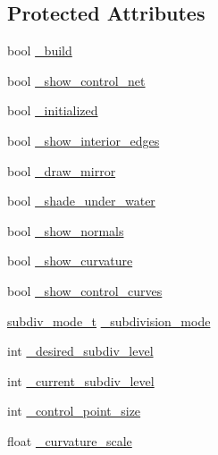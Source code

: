 \subsection*{Protected Attributes}
\begin{DoxyCompactItemize}
\item 
bool \hyperlink{classShipCAD_1_1SubdivisionSurface_ad360f009ac9c27aad0a88b2df7070414}{\-\_\-build}
\item 
bool \hyperlink{classShipCAD_1_1SubdivisionSurface_ab9bb374cf1368b4a2c779f953bca88a8}{\-\_\-show\-\_\-control\-\_\-net}
\item 
bool \hyperlink{classShipCAD_1_1SubdivisionSurface_a828f85ee49e1481e95f61b919070842c}{\-\_\-initialized}
\item 
bool \hyperlink{classShipCAD_1_1SubdivisionSurface_a4458d02152bd97495938586c89e6d9e2}{\-\_\-show\-\_\-interior\-\_\-edges}
\item 
bool \hyperlink{classShipCAD_1_1SubdivisionSurface_a4ee73ae98bddfe1819419afd1d5ba029}{\-\_\-draw\-\_\-mirror}
\item 
bool \hyperlink{classShipCAD_1_1SubdivisionSurface_ac3294d41679de31e588d603e3428565e}{\-\_\-shade\-\_\-under\-\_\-water}
\item 
bool \hyperlink{classShipCAD_1_1SubdivisionSurface_a0cc840743e7afcd136ab864ace158a17}{\-\_\-show\-\_\-normals}
\item 
bool \hyperlink{classShipCAD_1_1SubdivisionSurface_abe2167085eac50c986b074635b610462}{\-\_\-show\-\_\-curvature}
\item 
bool \hyperlink{classShipCAD_1_1SubdivisionSurface_ae240b2177e0af0bd1512c94b524f22dd}{\-\_\-show\-\_\-control\-\_\-curves}
\item 
\hyperlink{namespaceShipCAD_a4a9d1acfd6a2e1e9078a5dcc36f0c817}{subdiv\-\_\-mode\-\_\-t} \hyperlink{classShipCAD_1_1SubdivisionSurface_a0af5c881dfa24574962f42d80da997ee}{\-\_\-subdivision\-\_\-mode}
\item 
int \hyperlink{classShipCAD_1_1SubdivisionSurface_aeec20f09be87e6d57d88f903853ca96f}{\-\_\-desired\-\_\-subdiv\-\_\-level}
\item 
int \hyperlink{classShipCAD_1_1SubdivisionSurface_a9e5424746eced5d0a06ccbe4055bd06f}{\-\_\-current\-\_\-subdiv\-\_\-level}
\item 
int \hyperlink{classShipCAD_1_1SubdivisionSurface_a7ad820b9d312c8ecde939b5345690d35}{\-\_\-control\-\_\-point\-\_\-size}
\item 
float \hyperlink{classShipCAD_1_1SubdivisionSurface_acf241b41a8ca897306decbbab8e44c69}{\-\_\-curvature\-\_\-scale}

\end{DoxyCompactItemize}
